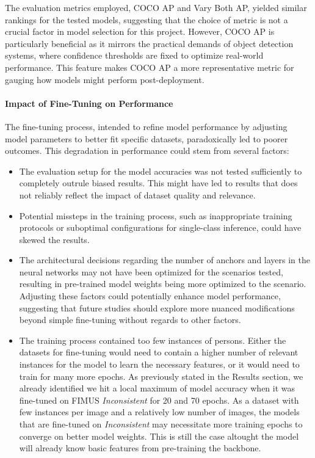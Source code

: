 The evaluation metrics employed, COCO AP and Vary Both AP, yielded similar rankings for the tested models, suggesting that the choice of metric is not a crucial factor in model selection for this project. However, COCO AP is particularly beneficial as it mirrors the practical demands of object detection systems, where confidence thresholds are fixed to optimize real-world performance. This feature makes COCO AP a more representative metric for gauging how models might perform post-deployment.

\paragraph{Impact of Fine-Tuning on Performance}
The fine-tuning process, intended to refine model performance by adjusting model parameters to better fit specific datasets, paradoxically led to poorer outcomes. This degradation in performance could stem from several factors:
\begin{itemize}
    \item The evaluation setup for the model accuracies was not tested sufficiently to completely outrule biased results. This might have led to results that does not reliably reflect the impact of dataset quality and relevance.
    \item Potential missteps in the training process, such as inappropriate training protocols or suboptimal configurations for single-class inference, could have skewed the results.
    \item The architectural decisions regarding the number of anchors and layers in the neural networks may not have been optimized for the scenarios tested, resulting in pre-trained model weights being more optimized to the scenario. Adjusting these factors could potentially enhance model performance, suggesting that future studies should explore more nuanced modifications beyond simple fine-tuning without regards to other factors.
    \item The training process contained too few instances of persons. Either the datasets for fine-tuning would need to contain a higher number of relevant instances for the model to learn the necessary features, or it would need to train for many more epochs. As previously stated in the Results section, we already identified we hit a local maximum of model accuracy when it was fine-tuned on FIMUS \textit{Inconsistent} for 20 and 70 epochs. As a dataset with few instances per image and a relatively low number of images, the models that are fine-tuned on \textit{Inconsistent} may necessitate more training epochs to converge on better model weights. This is still the case altought the model will already know basic features from pre-training the backbone.
\end{itemize}

